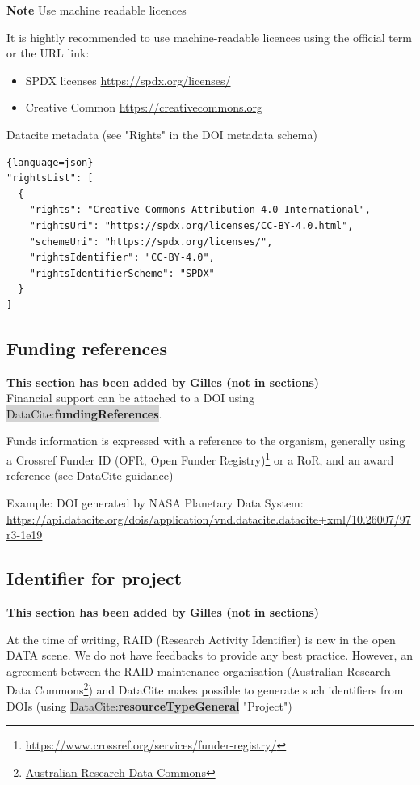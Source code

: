 \documentclass[11pt,a4paper]{ivoa}
\newcommand{\dataciteterm}[1]{\colorbox{lightgray}{DataCite:\textbf{#1}}}
\newcommand{\important}[1]{
	\begin{bigdescription}
		\item \color{ivoacolor}\textbf{Note} #1
	\end{bigdescription}
}
\begin{document}
\important{Use machine readable licences}

It is hightly recommended to use machine-readable licences using the official term or the URL link:

\begin{itemize}
\item SPDX licenses \url{https://spdx.org/licenses/}
\item Creative Common \url{https://creativecommons.org}
\end{itemize}

Datacite metadata (see "Rights" in the DOI metadata schema)

\begin{lstlisting}{language=json}
"rightsList": [
  {
    "rights": "Creative Commons Attribution 4.0 International",
    "rightsUri": "https://spdx.org/licenses/CC-BY-4.0.html",
    "schemeUri": "https://spdx.org/licenses/",
    "rightsIdentifier": "CC-BY-4.0",
    "rightsIdentifierScheme": "SPDX"
  }
]
\end{lstlisting}

\subsection{Funding references}
\textbf{\color{red}This section has been added by Gilles (not in sections)}\\

Financial support can be attached to a DOI using \dataciteterm{fundingReferences}.

Funds information is expressed with a reference to the organism, generally using a Crossref Funder ID (OFR, Open Funder Registry)\footnote{\url{https://www.crossref.org/services/funder-registry/}} or a RoR, and an award reference (see DataCite guidance)


Example: DOI generated by NASA Planetary Data System:
\url{https://api.datacite.org/dois/application/vnd.datacite.datacite+xml/10.26007/97r3-1e19}



\subsection{Identifier for project}
\textbf{\color{red}This section has been added by Gilles (not in sections)}

At the time of writing, RAID (Research Activity Identifier) is new in the open DATA scene. We do not have feedbacks to provide any best practice. However, an agreement between the RAID maintenance organisation (Australian Research Data Commons\footnote{\url{ Australian Research Data Commons}}) and DataCite makes possible to generate such identifiers from DOIs (using \dataciteterm{resourceTypeGeneral} "Project")
\end{document}
